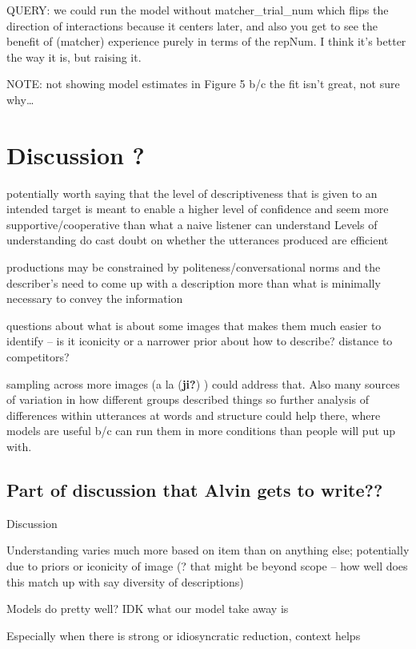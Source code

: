 \documentclass[10pt, letterpaper]{article}
\begin{document}
QUERY: we could run the model without matcher\_trial\_num which flips
the direction of interactions because it centers later, and also you get
to see the benefit of (matcher) experience purely in terms of the
repNum. I think it's better the way it is, but raising it.

NOTE: not showing model estimates in Figure 5 b/c the fit isn't great,
not sure why\ldots{}

\section{Discussion ?}\label{discussion}

potentially worth saying that the level of descriptiveness that is given
to an intended target is meant to enable a higher level of confidence
and seem more supportive/cooperative than what a naive listener can
understand Levels of understanding do cast doubt on whether the
utterances produced are efficient

productions may be constrained by politeness/conversational norms and
the describer's need to come up with a description more than what is
minimally necessary to convey the information

questions about what is about some images that makes them much easier to
identify -- is it iconicity or a narrower prior about how to describe?
distance to competitors?

sampling across more images (a la (\textbf{ji?}) ) could address that.
Also many sources of variation in how different groups described things
so further analysis of differences within utterances at words and
structure could help there, where models are useful b/c can run them in
more conditions than people will put up with.

\subsection{Part of discussion that Alvin gets to
write??}\label{part-of-discussion-that-alvin-gets-to-write}

Discussion

Understanding varies much more based on item than on anything else;
potentially due to priors or iconicity of image (? that might be beyond
scope -- how well does this match up with say diversity of descriptions)

Models do pretty well? IDK what our model take away is

Especially when there is strong or idiosyncratic reduction, context
helps
\end{document}

